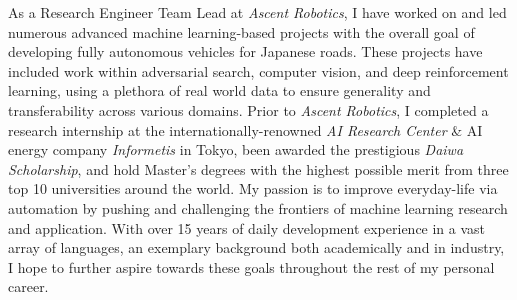 

\begin{cvparagraph}

As a Research Engineer Team Lead at \emph{Ascent Robotics}, I have worked on and led numerous advanced machine learning-based projects with the overall goal of developing fully autonomous vehicles for Japanese roads. These projects have included work within adversarial search, computer vision, and deep reinforcement learning, using a plethora of real world data to ensure generality and transferability across various domains. Prior to \emph{Ascent Robotics}, I completed a research internship at the internationally-renowned \emph{AI Research Center} \& AI energy company \emph{Informetis} in Tokyo, been awarded the prestigious \emph{Daiwa Scholarship}, and hold Master's degrees with the highest possible merit from three top 10 universities around the world. My passion is to improve everyday-life via automation by pushing and challenging the frontiers of machine learning research and application. With over 15 years of daily development experience in a vast array of languages, an exemplary background both academically and in industry, I hope to further aspire towards these goals throughout the rest of my personal career.



\end{cvparagraph}
